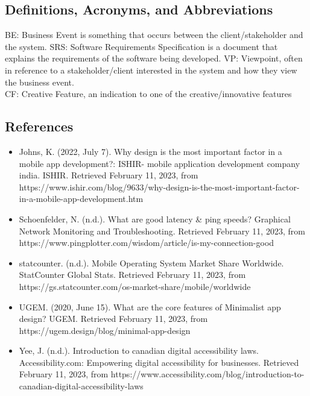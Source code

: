 \documentclass[]{article}
\begin{document}
\subsection{Definitions, Acronyms, and Abbreviations}
\label{sub:definitions_acronyms_and_abbreviations}
BE: Business Event is something that occurs between the client/stakeholder and the system. 
\newline \newline
SRS: Software Requirements Specification is a document that explains the requirements of the software being developed.
\newline \newline
VP: Viewpoint, often in reference to a stakeholder/client interested in the system and how they view the business event. \\
CF: Creative Feature, an indication to one of the creative/innovative features

\subsection{References}
\label{sub:references}
\begin{itemize}
	\item Johns, K. (2022, July 7). Why design is the most important factor in a mobile app development?: ISHIR- mobile application development company india. ISHIR. Retrieved February 11, 2023, from https://www.ishir.com/blog/9633/why-design-is-the-most-important-factor-in-a-mobile-app-development.htm 
	\item Schoenfelder, N. (n.d.). What are good latency \& ping speeds? Graphical Network Monitoring and Troubleshooting. Retrieved February 11, 2023, from https://www.pingplotter.com/wisdom/article/is-my-connection-good 
	\item statcounter. (n.d.). Mobile Operating System Market Share Worldwide. StatCounter Global Stats. Retrieved February 11, 2023, from https://gs.statcounter.com/os-market-share/mobile/worldwide 
	\item UGEM. (2020, June 15). What are the core features of Minimalist app design? UGEM. Retrieved February 11, 2023, from https://ugem.design/blog/minimal-app-design 
	\item Yee, J. (n.d.). Introduction to canadian digital accessibility laws. Accessibility.com: Empowering digital accessibility for businesses. Retrieved February 11, 2023, from https://www.accessibility.com/blog/introduction-to-canadian-digital-accessibility-laws 
\end{itemize}
\end{document}

